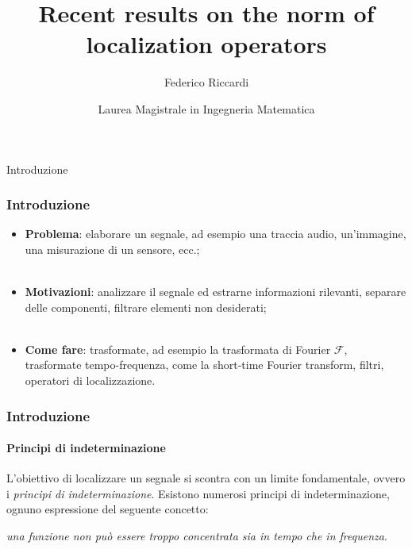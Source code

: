 \documentclass[aspectratio=141]{beamer}
\title[Recent results on the norm of localization operators]{Recent results on the norm of localization operators}
\date[ISPN ’80]{Laurea Magistrale in Ingegneria Matematica}
\author[F. Riccardi]{Federico Riccardi}
\newcommand{\F}{\mathscr{F}} %
\newcommand{\emptyline}{\phantom{ }\\}
\begin{document}
	


\begin{frame}
\titlepage
\end{frame}


\begin{section}{Introduzione}
	
	\begin{frame}
		\frametitle{Introduzione}
		\begin{itemize}
			\item \textbf{Problema}: elaborare un segnale, ad esempio una traccia audio, un'immagine, una misurazione di un sensore, ecc.;\\
			\pause
			\emptyline
			\item \textbf{Motivazioni}: analizzare il segnale ed estrarne informazioni rilevanti, separare delle componenti, filtrare elementi non desiderati;\\
			\pause
			\emptyline
			\item \textbf{Come fare}: trasformate, ad esempio la trasformata di Fourier $\F$, trasformate tempo-frequenza, come la short-time Fourier transform, filtri, operatori di localizzazione.
		\end{itemize}
	\end{frame}

	\begin{frame}
		\frametitle{Introduzione}
		\framesubtitle{Principi di indeterminazione}
		L'obiettivo di localizzare un segnale si scontra con un limite fondamentale, ovvero i \emph{principi di indeterminazione}. Esistono numerosi principi di indeterminazione, ognuno espressione del seguente concetto:
		\begin{center}
			\emph{una funzione non può essere troppo concentrata sia in tempo che in frequenza}.
		\end{center}
		\begin{center}
			\begin{figure}
\end{figure}
\end{center}
\end{frame}
\end{section}
\end{document}
